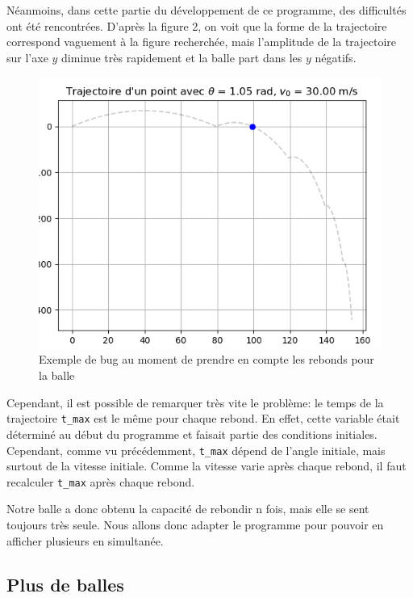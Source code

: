 \documentclass[a4paper,11pt]{article}
\begin{document}
Néanmoins, dans cette partie du développement de ce programme, des difficultés ont été rencontrées. D'après la figure 2, on voit que la forme de la trajectoire correspond vaguement à la figure recherchée, mais l'amplitude de la trajectoire sur l'axe $y$ diminue très rapidement et la balle part dans les $y$ négatifs.

\begin{figure}[H]
	\centering
	\includegraphics[scale=0.4]{Figures/bug_classe_rebond.png}
	\caption{Exemple de bug au moment de prendre en compte les rebonds pour la balle}
	\label{fig:bug_reb} 
\end{figure}

Cependant, il est possible de remarquer très vite le problème: le temps de la trajectoire \verb|t_max| est le même pour chaque rebond. En effet, cette variable était déterminé au début du programme et faisait partie des conditions initiales. Cependant, comme vu précédemment, \verb|t_max| dépend de l'angle initiale, mais surtout de la vitesse initiale. Comme la vitesse varie après chaque rebond, il faut recalculer \verb|t_max| après chaque rebond.

Notre balle a donc obtenu la capacité de rebondir n fois, mais elle se sent toujours très seule. Nous allons donc adapter le programme pour pouvoir en afficher plusieurs en simultanée.


\subsection{Plus de balles}
\end{document}
